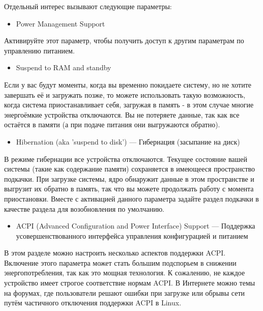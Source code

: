 \documentclass[10pt]{book}
\begin{document}
Отдельный интерес вызывают следующие параметры:

\begin{itemize}
\item Power Management Support
\end{itemize}

Активируйте этот параметр, чтобы получить доступ к другим параметрам по управлению питанием.

\begin{itemize}
\item Suspend to RAM and standby                            
\end{itemize}


Если у вас будут моменты, когда вы временно покидаете систему, но не хотите завершать её и загружать позже, то можете использовать такую возможность, когда система приостанавливает себя, загружая в память - в этом случае многие энергоёмкие устройства отключаются. Вы не потеряете данные, так как все остаётся в памяти (а при подаче питания они выгружаются обратно).

\begin{itemize}
\item Hibernation (aka 'suspend to disk') — Гибернация (засыпание на диск)                                                                      
\end{itemize}


В режиме гибернации все устройства отключаются. Текущее состояние вашей системы (такие как содержание памяти) сохраняется в имеющееся пространство подкачки. При загрузке системы, ядро обнаружит данные в этом пространстве и выгрузит их обратно в память, так что вы можете продолжать работу с момента приостановки.
Вместе с активацией данного параметра задайте раздел подкачки в качестве раздела для возобновления по умолчанию.

\begin{itemize}
\item ACPI (Advanced Configuration and Power Interface) Support — Поддержка усовершенствованного интерфейса управления конфигурацией и питанием                                                                                                                                           
\end{itemize}

В этом разделе можно настроить несколько аспектов поддержки ACPI. Включение этого параметра может стать большим подспорьем в снижении энергопотребления, так как это мощная технология. К сожалению, не каждое устройство имеет строгое соответствие нормам ACPI. В Интернете можно  темы на форумах, где пользователи решают ошибки при загрузке или обрывы сети путём частичного отключения поддержки ACPI в Linux.
\end{document}
